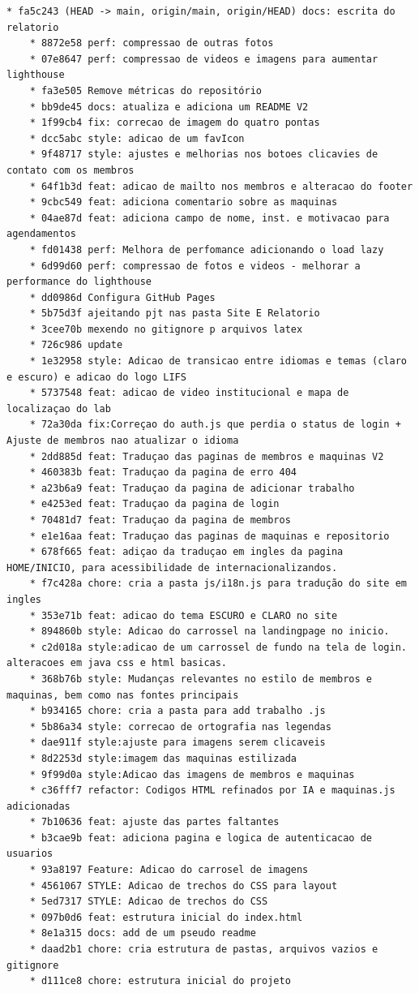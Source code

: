 \begin{lstlisting}[style=gitstyle,
	caption={Histórico de commits do desenvolvimento do projeto.},
	label={lst:historico-git}]
	* fa5c243 (HEAD -> main, origin/main, origin/HEAD) docs: escrita do relatorio
	* 8872e58 perf: compressao de outras fotos
	* 07e8647 perf: compressao de videos e imagens para aumentar lighthouse
	* fa3e505 Remove métricas do repositório
	* bb9de45 docs: atualiza e adiciona um README V2
	* 1f99cb4 fix: correcao de imagem do quatro pontas
	* dcc5abc style: adicao de um favIcon
	* 9f48717 style: ajustes e melhorias nos botoes clicavies de contato com os membros
	* 64f1b3d feat: adicao de mailto nos membros e alteracao do footer
	* 9cbc549 feat: adiciona comentario sobre as maquinas
	* 04ae87d feat: adiciona campo de nome, inst. e motivacao para agendamentos
	* fd01438 perf: Melhora de perfomance adicionando o load lazy
	* 6d99d60 perf: compressao de fotos e videos - melhorar a performance do lighthouse
	* dd0986d Configura GitHub Pages
	* 5b75d3f ajeitando pjt nas pasta Site E Relatorio
	* 3cee70b mexendo no gitignore p arquivos latex
	* 726c986 update
	* 1e32958 style: Adicao de transicao entre idiomas e temas (claro e escuro) e adicao do logo LIFS
	* 5737548 feat: adicao de video institucional e mapa de localizaçao do lab
	* 72a30da fix:Correçao do auth.js que perdia o status de login + Ajuste de membros nao atualizar o idioma
	* 2dd885d feat: Traduçao das paginas de membros e maquinas V2
	* 460383b feat: Traduçao da pagina de erro 404
	* a23b6a9 feat: Traduçao da pagina de adicionar trabalho
	* e4253ed feat: Traduçao da pagina de login
	* 70481d7 feat: Traduçao da pagina de membros
	* e1e16aa feat: Traduçao das paginas de maquinas e repositorio
	* 678f665 feat: adiçao da traduçao em ingles da pagina HOME/INICIO, para acessibilidade de internacionalizandos.
	* f7c428a chore: cria a pasta js/i18n.js para tradução do site em ingles
	* 353e71b feat: adicao do tema ESCURO e CLARO no site
	* 894860b style: Adicao do carrossel na landingpage no inicio.
	* c2d018a style:adicao de um carrossel de fundo na tela de login. alteracoes em java css e html basicas.
	* 368b76b style: Mudanças relevantes no estilo de membros e maquinas, bem como nas fontes principais
	* b934165 chore: cria a pasta para add trabalho .js
	* 5b86a34 style: correcao de ortografia nas legendas
	* dae911f style:ajuste para imagens serem clicaveis
	* 8d2253d style:imagem das maquinas estilizada
	* 9f99d0a style:Adicao das imagens de membros e maquinas
	* c36fff7 refactor: Codigos HTML refinados por IA e maquinas.js adicionadas
	* 7b10636 feat: ajuste das partes faltantes
	* b3cae9b feat: adiciona pagina e logica de autenticacao de usuarios
	* 93a8197 Feature: Adicao do carrosel de imagens
	* 4561067 STYLE: Adicao de trechos do CSS para layout
	* 5ed7317 STYLE: Adicao de trechos do CSS
	* 097b0d6 feat: estrutura inicial do index.html
	* 8e1a315 docs: add de um pseudo readme
	* daad2b1 chore: cria estrutura de pastas, arquivos vazios e gitignore
	* d111ce8 chore: estrutura inicial do projeto
\end{lstlisting}